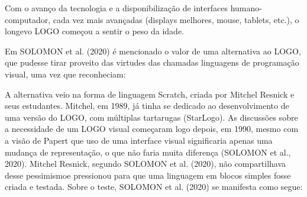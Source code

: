 \documentclass[
12pt,		%
openright,	%
twoside,  %
a4paper,			%
chapter=TITLE,		%
english,			%
french,				%
spanish,			%
brazil				%
]{USPSC-classe/USPSC}
\begin{document}
Com o avan\c{c}o da tecnologia e a disponibiliza\c{c}\~ao de interfaces humano-computador, cada vez mais avan\c{c}adas (displays melhores, mouse, tablets, etc.), o longevo LOGO come\c{c}ou a sentir o peso da idade.









Em SOLOMON et al. (2020) \'e mencionado o valor de uma alternativa ao LOGO, que pudesse tirar proveito das virtudes das chamadas \textquotedbl linguagens de programa\c{c}\~ao visual\textquotedbl , uma vez que reconheciam:










\noindent\begin{center}\mbox{\centering{}}\end{center}


A alternativa veio na forma de linguagem Scratch, criada por Mitchel Resnick e seus estudantes. Mitchel, em 1989, j\'a tinha se dedicado ao desenvolvimento de uma vers\~ao do LOGO, com m\'ultiplas tartarugas (StarLogo). As discuss\~oes sobre a necessidade de um  LOGO visual come\c{c}aram logo depois, em 1990, mesmo com a vis\~ao de Papert que uso de uma interface visual significaria apenas uma mudan\c{c}a de representa\c{c}\~ao, o que n\~ao faria muita diferen\c{c}a   (SOLOMON et al., 2020). Mitchel Resnick, segundo  SOLOMON et al. (2020), \textquotedbl n\~ao compartilhava desse pessimismo\textquotedbl  e pressionou para que uma linguagem em blocos simples fosse criada e testada. Sobre o teste,  SOLOMON et al. (2020) se manifesta como segue:










\noindent\begin{center}\mbox{\centering{}}\end{center}
\end{document}
